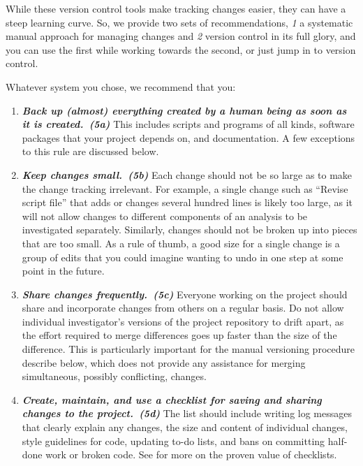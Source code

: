 \documentclass[10pt,letterpaper]{article}
\newcommand{\practice}[2]{\textbf{\emph{{#2}~({#1})}}}
\begin{document}
While these version control tools make tracking changes easier, they
can have a steep learning curve. So, we provide two sets of
recommendations, \emph{1} a systematic manual approach for managing
changes and \emph{2} version control in its full glory, and you can
use the first while working towards the second, or just jump in to
version control.

Whatever system you chose, we recommend that you:

\begin{enumerate}

\item

  \practice{5a}{Back up (almost) everything created by a human being
  as soon as it is created.} This includes scripts and programs of
  all kinds, software packages that your project depends on, and
  documentation. A few exceptions to this rule are discussed below.

\item

  \practice{5b}{Keep changes small.}  Each change should not be so
  large as to make the change tracking irrelevant. For example, a
  single change such as ``Revise script file'' that adds or changes
  several hundred lines is likely too large, as it will not allow
  changes to different components of an analysis to be investigated
  separately. Similarly, changes should not be broken up into pieces
  that are too small. As a rule of thumb, a good size for a single
  change is a group of edits that you could imagine wanting to undo in
  one step at some point in the future.

\item

  \practice{5c}{Share changes frequently.} Everyone working on the
  project should share and incorporate changes from others on a
  regular basis. Do not allow individual investigator's versions of
  the project repository to drift apart, as the effort required to
  merge differences goes up faster than the size of the
  difference. This is particularly important for the manual versioning
  procedure describe below, which does not provide any assistance for
  merging simultaneous, possibly conflicting, changes.

\item

  \practice{5d}{Create, maintain, and use a checklist for saving and
  sharing changes to the project.} The list should include writing
  log messages that clearly explain any changes, the size and content
  of individual changes, style guidelines for code, updating to-do
  lists, and bans on committing half-done work or broken code.  See
  \cite{gawande2011} for more on the proven value of checklists.


\end{enumerate}
\end{document}
